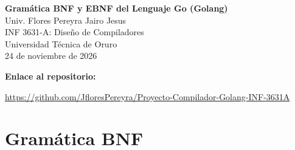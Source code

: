 \documentclass[11pt, a4paper]{article}
\begin{document}
\begin{center}
    {\Large\bfseries Gramática BNF y EBNF del Lenguaje Go (Golang)}\\[0.6em]
    Univ. Flores Pereyra Jairo Jesus \\
    INF 3631-A: Diseño de Compiladores \\
    Universidad Técnica de Oruro \\[0.4em]
    24 de noviembre de 2026
\end{center}

\noindent\textbf{Enlace al repositorio:}\par
\noindent\raggedright{\small\url{https://github.com/JfloresPereyra/Proyecto-Compilador-Golang-INF-3631A}}

\section{Gramática BNF}
\end{document}
